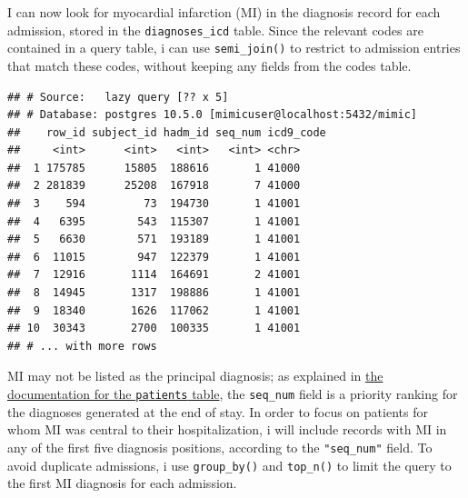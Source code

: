 \documentclass[]{article}
\newenvironment{Shaded}{\begin{snugshade}}{\end{snugshade}}
\newcommand{\KeywordTok}[1]{\textcolor[rgb]{0.13,0.29,0.53}{\textbf{#1}}}
\newcommand{\DataTypeTok}[1]{\textcolor[rgb]{0.13,0.29,0.53}{#1}}
\newcommand{\DecValTok}[1]{\textcolor[rgb]{0.00,0.00,0.81}{#1}}
\newcommand{\StringTok}[1]{\textcolor[rgb]{0.31,0.60,0.02}{#1}}
\newcommand{\OperatorTok}[1]{\textcolor[rgb]{0.81,0.36,0.00}{\textbf{#1}}}
\newcommand{\NormalTok}[1]{#1}
\begin{document}
I can now look for myocardial infarction (MI) in the diagnosis record
for each admission, stored in the \texttt{diagnoses\_icd} table. Since
the relevant codes are contained in a query table, i can use
\texttt{semi\_join()} to restrict to admission entries that match these
codes, without keeping any fields from the codes table.

\begin{Shaded}
\end{Shaded}

\begin{verbatim}
## # Source:   lazy query [?? x 5]
## # Database: postgres 10.5.0 [mimicuser@localhost:5432/mimic]
##    row_id subject_id hadm_id seq_num icd9_code
##     <int>      <int>   <int>   <int> <chr>    
##  1 175785      15805  188616       1 41000    
##  2 281839      25208  167918       7 41000    
##  3    594         73  194730       1 41001    
##  4   6395        543  115307       1 41001    
##  5   6630        571  193189       1 41001    
##  6  11015        947  122379       1 41001    
##  7  12916       1114  164691       2 41001    
##  8  14945       1317  198886       1 41001    
##  9  18340       1626  117062       1 41001    
## 10  30343       2700  100335       1 41001    
## # ... with more rows
\end{verbatim}

MI may not be listed as the principal diagnosis; as explained in
\href{https://mimic.mit.edu/docs/III/tables/diagnoses_icd.html}{the
documentation for the \texttt{patients} table}, the \texttt{seq\_num}
field is a priority ranking for the diagnoses generated at the end of
stay. In order to focus on patients for whom MI was central to their
hospitalization, i will include records with MI in any of the first five
diagnosis positions, according to the \texttt{"seq\_num"} field. To
avoid duplicate admissions, i use \texttt{group\_by()} and
\texttt{top\_n()} to limit the query to the first MI diagnosis for each
admission.

\begin{Shaded}
\end{Shaded}
\end{document}
